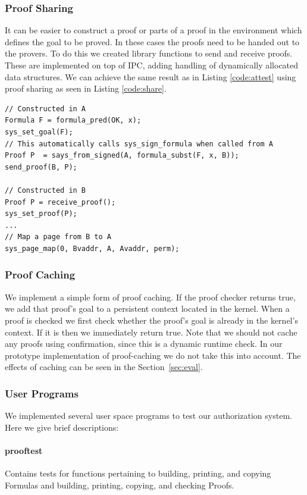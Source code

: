 \documentclass[10pt]{article}
\begin{document}
\subsubsection{Proof Sharing}
It can be easier to construct a proof or parts of a proof in the environment which defines the goal to be proved.  In these cases the proofs need to be handed out to the provers.  To do this we created library functions to send and receive proofs.  These are implemented on top of IPC, adding handling of dynamically allocated data structures.  We can achieve the same result as in Listing \ref{code:attest} using proof sharing as seen in Listing \ref{code:share}.
\begin{lstlisting}
// Constructed in A
Formula F = formula_pred(OK, x);
sys_set_goal(F);
// This automatically calls sys_sign_formula when called from A
Proof P  = says_from_signed(A, formula_subst(F, x, B));
send_proof(B, P);

// Constructed in B
Proof P = receive_proof();
sys_set_proof(P);
...
// Map a page from B to A
sys_page_map(0, Bvaddr, A, Avaddr, perm);
\end{lstlisting}

\subsubsection{Proof Caching}\label{sec:cache}
We implement a simple form of proof caching.  If the proof checker returns true, we add that proof's goal to a persistent context located in the kernel.  When a proof is checked we first check whether the proof's goal is already in the kernel's context.  If it is then we immediately return true.  Note that we should not cache any proofs using confirmation, since this is a dynamic runtime check.  In our prototype implementation of proof-caching we do not take this into account. The effects of caching can be seen in the Section~\ref{sec:eval}.

\subsubsection{User Programs}
We implemented several user space programs to test our authorization system. Here we give brief descriptions:

\paragraph{prooftest} Contains tests for functions pertaining to building, printing, and copying Formulas and building, printing, copying, and checking Proofs.
\end{document}
